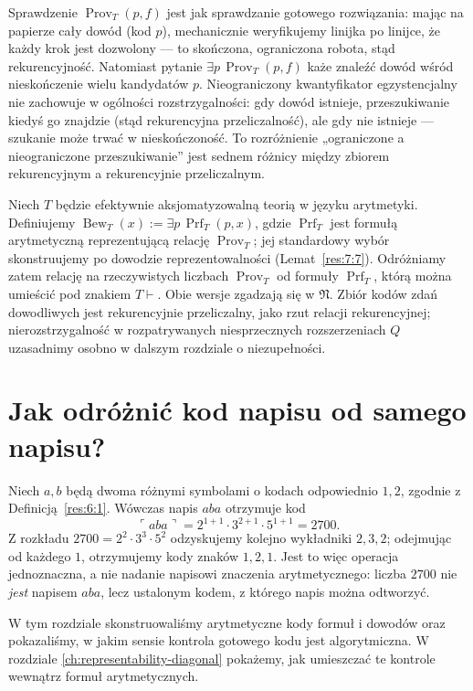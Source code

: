 \begin{przyklad}\label{res:6:6}
Sprawdzenie $\operatorname{Prov}_T(p,f)$ jest jak sprawdzanie gotowego rozwiązania: mając na papierze cały dowód (kod $p$), mechanicznie weryfikujemy linijka po linijce, że każdy krok jest dozwolony --- to skończona, ograniczona robota, stąd rekurencyjność. Natomiast pytanie $\exists p\,\operatorname{Prov}_T(p,f)$ każe znaleźć dowód wśród nieskończenie wielu kandydatów $p$. Nieograniczony kwantyfikator egzystencjalny nie zachowuje w ogólności rozstrzygalności: gdy dowód istnieje, przeszukiwanie kiedyś go znajdzie (stąd rekurencyjna przeliczalność), ale gdy nie istnieje --- szukanie może trwać w nieskończoność. To rozróżnienie „ograniczone a nieograniczone przeszukiwanie” jest sednem różnicy między zbiorem rekurencyjnym a rekurencyjnie przeliczalnym.
\end{przyklad}

\begin{definicja}\label{res:6:7}
Niech $T$ będzie efektywnie aksjomatyzowalną teorią w języku arytmetyki. Definiujemy $\operatorname{Bew}_T(x):=\exists p\,\operatorname{Prf}_T(p,x)$, gdzie $\operatorname{Prf}_T$ jest formułą arytmetyczną reprezentującą relację $\operatorname{Prov}_T$; jej standardowy wybór skonstruujemy po dowodzie reprezentowalności (Lemat~\ref{res:7:7}). Odróżniamy zatem relację na rzeczywistych liczbach $\operatorname{Prov}_T$ od formuły $\operatorname{Prf}_T$, którą można umieścić pod znakiem $T\vdash$. Obie wersje zgadzają się w $\mathfrak N$. Zbiór kodów zdań dowodliwych jest rekurencyjnie przeliczalny, jako rzut relacji rekurencyjnej; nierozstrzygalność w rozpatrywanych niesprzecznych rozszerzeniach $Q$ uzasadnimy osobno w dalszym rozdziale o niezupełności.
\end{definicja}



\section{Jak odróżnić kod napisu od samego napisu?}
\begin{przyklad}
Niech $a,b$ będą dwoma różnymi symbolami o kodach odpowiednio $1,2$,
zgodnie z Definicją~\ref{res:6:1}. Wówczas napis $aba$ otrzymuje kod
\[
\ulcorner aba\urcorner=2^{1+1}\cdot3^{2+1}\cdot5^{1+1}=2700.
\]
Z rozkładu $2700=2^2\cdot3^3\cdot5^2$ odzyskujemy
kolejno wykładniki $2,3,2$; odejmując od każdego $1$,
otrzymujemy kody znaków $1,2,1$. Jest to więc
operacja jednoznaczna, a nie nadanie napisowi znaczenia
arytmetycznego: liczba $2700$ nie \emph{jest} napisem $aba$,
lecz ustalonym kodem, z którego napis można odtworzyć.
\end{przyklad}
\begin{uwaga}
W tym rozdziale skonstruowaliśmy arytmetyczne kody
formuł i dowodów oraz pokazaliśmy, w jakim sensie
kontrola gotowego kodu jest algorytmiczna. W rozdziale
\ref{ch:representability-diagonal} pokażemy, jak
umieszczać te kontrole wewnątrz formuł arytmetycznych.
\end{uwaga}